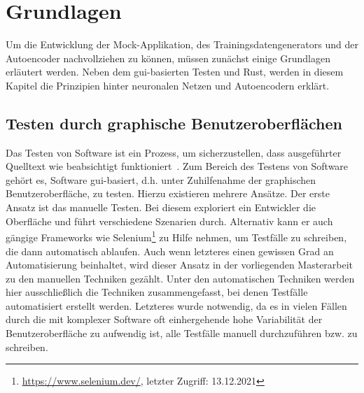 \chapter{Grundlagen}
Um die Entwicklung der Mock-Applikation, des Trainingsdatengenerators und der Autoencoder nachvollziehen zu können, müssen zunächst einige Grundlagen erläutert werden. Neben dem \gls{gui}-basierten Testen und Rust, werden in diesem Kapitel die Prinzipien hinter neuronalen Netzen und Autoencodern erklärt.

\section{Testen durch graphische Benutzeroberflächen}


Das Testen von Software ist ein Prozess, um sicherzustellen, dass ausgeführter Quelltext wie beabsichtigt funktioniert~\cite[S. 2]{myersArtSoftwareTesting2011}. Zum Bereich des Testens von Software gehört es, Software \gls{gui}-basiert, d.h. unter Zuhilfenahme der graphischen Benutzeroberfläche, zu testen. Hierzu existieren mehrere Ansätze. Der erste Ansatz ist das manuelle Testen. Bei diesem exploriert ein Entwickler die Oberfläche und führt verschiedene Szenarien durch. Alternativ kann er auch gängige Frameworks wie Selenium\footnote{\url{https://www.selenium.dev/}, letzter Zugriff: 13.12.2021} zu Hilfe nehmen, um Testfälle zu schreiben, die dann automatisch ablaufen. Auch wenn letzteres einen gewissen Grad an Automatisierung beinhaltet, wird dieser Ansatz in der vorliegenden Masterarbeit zu den manuellen Techniken gezählt. Unter den automatischen Techniken werden hier ausschließlich die Techniken zusammengefasst, bei denen Testfälle automatisiert erstellt werden. Letzteres wurde notwendig, da es in vielen Fällen durch die mit komplexer Software oft einhergehende hohe Variabilität der Benutzeroberfläche zu aufwendig ist, alle Testfälle manuell durchzuführen bzw. zu schreiben.

